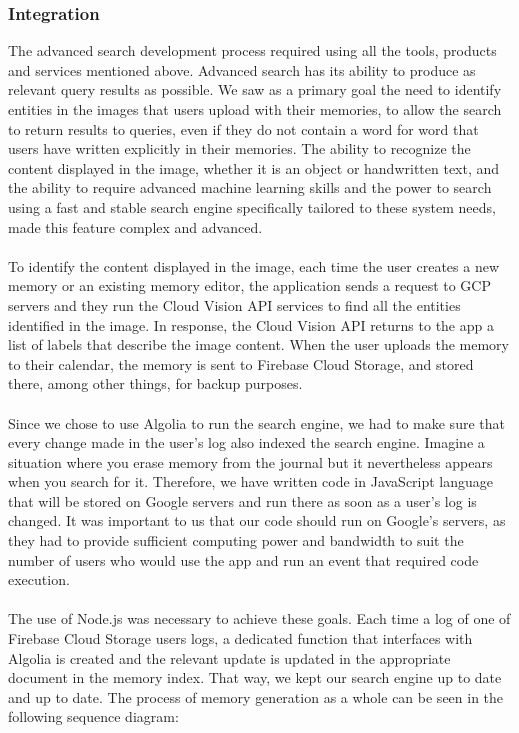 \documentclass{article}
\begin{document}
\subsubsection{Integration}
The advanced search development process required using all the tools, products and services mentioned above. Advanced search has its ability to produce as relevant query results as possible. We saw as a primary goal the need to identify entities in the images that users upload with their memories, to allow the search to return results to queries, even if they do not contain a word for word that users have written explicitly in their memories. The ability to recognize the content displayed in the image, whether it is an object or handwritten text, and the ability to require advanced machine learning skills and the power to search using a fast and stable search engine specifically tailored to these system needs, made this feature complex and advanced.
\\\\
To identify the content displayed in the image, each time the user creates a new memory or an existing memory editor, the application sends a request to GCP servers and they run the Cloud Vision API services to find all the entities identified in the image. In response, the Cloud Vision API returns to the app a list of labels that describe the image content. When the user uploads the memory to their calendar, the memory is sent to Firebase Cloud Storage, and stored there, among other things, for backup purposes.\\\\
Since we chose to use Algolia to run the search engine, we had to make sure that every change made in the user's log also indexed the search engine.
Imagine a situation where you erase memory from the journal but it nevertheless appears when you search for it. Therefore, we have written code in JavaScript language that will be stored on Google servers and run there as soon as a user's log is changed. It was important to us that our code should run on Google's servers, as they had to provide sufficient computing power and bandwidth to suit the number of users who would use the app and run an event that required code execution.\\\\
The use of Node.js was necessary to achieve these goals. Each time a log of one of Firebase Cloud Storage users logs, a dedicated function that interfaces with Algolia is created and the relevant update is updated in the appropriate document in the memory index. That way, we kept our search engine up to date and up to date. The process of memory generation as a whole can be seen in the following sequence diagram:
\end{document}
